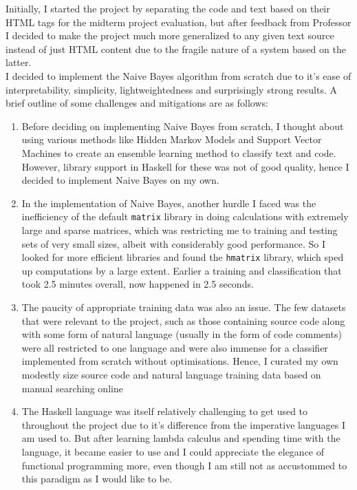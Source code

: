 \documentclass[12pt]{scrreprt}
\newcommand{\ttt}[1]{\texttt{#1}}
\begin{document}
Initially, I started the project by separating the code and text based on their HTML tags for the midterm project evaluation, but after feedback from Professor I decided to make the project much more generalized to any given text source instead of just HTML content due to the fragile nature of a system based on the latter. \\ I decided to implement the Naive Bayes algorithm from scratch due to it's ease of interpretability, simplicity, lightweightedness and surprisingly strong results. A brief outline of some challenges and mitigations are as follows:
\begin{enumerate}
    \item Before deciding on implementing Naive Bayes from scratch, I thought about using various methods like Hidden Markov Models and Support Vector Machines to create an ensemble learning method to classify text and code. However, library support in Haskell for these was not of good quality, hence I decided to implement Naive Bayes on my own.
    \item In the implementation of Naive Bayes, another hurdle I faced was the inefficiency of the default \ttt{matrix} library in doing calculations with extremely large and sparse matrices, which was restricting me to training and testing sets of very small sizes, albeit with considerably good performance. So I looked for more efficient libraries and found the \ttt{hmatrix} library, which sped up computations by a large extent. Earlier a training and classification that took 2.5 minutes overall, now happened in 2.5 seconds. 
    \item The paucity of appropriate training data was also an issue. The few datasets that were relevant to the project, such as those containing source code along with some form of natural language (usually in the form of code comments) were all restricted to one language and were also immense for a classifier implemented from scratch without optimisations. Hence, I curated my own modestly size source code and natural language training data based on manual searching online
    \item The Haskell language was itself relatively challenging to get used to throughout the project due to it's difference from the imperative languages I am used to. But after learning lambda calculus and spending time with the language, it became easier to use and I could appreciate the elegance of functional programming more, even though I am still not as accustommed to this paradigm as I would like to be. 
\end{enumerate}
\end{document}

